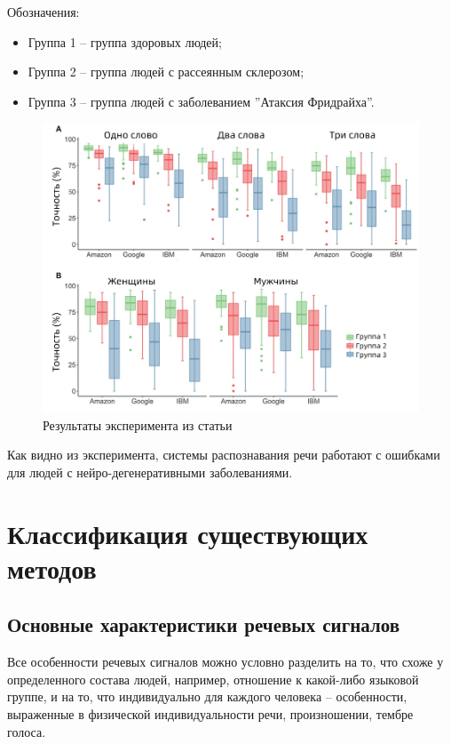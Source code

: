 Обозначения: 
\begin{itemize}
	\item Группа 1 -- группа здоровых людей;
	\item Группа 2 -- группа людей с рассеянным склерозом;
	\item Группа 3 -- группа людей с заболеванием ''Атаксия Фридрайха''.
\end{itemize}
\begin{figure}[h]
	\begin{center}
	\includegraphics[pages=-, scale=0.45]{./inc/img/primer2.png}
	\caption{Результаты эксперимента из статьи \cite{primer}}  
	\label{fig:xray1}
\end{center}
\end{figure}
\newpage


Как видно из эксперимента, системы распознавания речи работают с ошибками для людей с нейро-дегенеративными заболеваниями.


\chapter{Классификация существующих методов}
\section{Основные характеристики речевых сигналов}
Все особенности речевых сигналов можно условно разделить на то, что схоже у определенного состава людей, например, отношение к какой-либо языковой группе, и на то, что индивидуально для каждого человека -- особенности, выраженные в физической индивидуальности речи, произношении, тембре голоса. \cite{chastot} \cite{chastot2}


